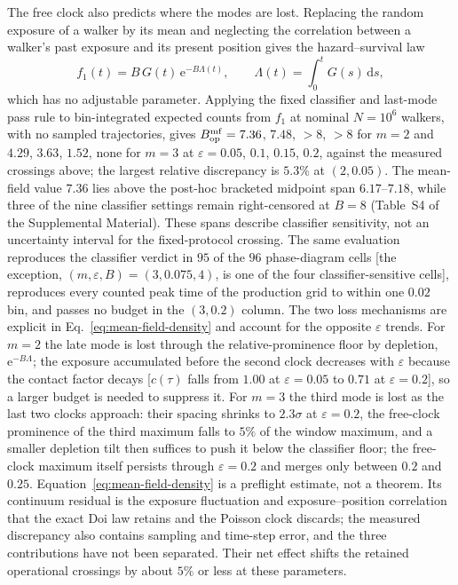 \documentclass[aps,physrev,reprint,amsmath,amssymb,longbibliography,floatfix]{revtex4-2}
\newcommand{\dd}{\mathrm d}
\newcommand{\e}{\mathrm e}
\begin{document}
The free clock also predicts where the modes are lost.  Replacing the random
exposure of a walker by its mean and neglecting the correlation between a
walker's past exposure and its present position gives the hazard--survival law
\begin{equation}
 f_1(t)=B\,G(t)\,\e^{-B\Lambda(t)},\qquad
 \Lambda(t)=\int_0^tG(s)\,\dd s,
 \label{eq:mean-field-density}
\end{equation}
which has no adjustable parameter.  Applying the fixed classifier and last-mode pass rule to bin-integrated
expected counts from \(f_1\) at nominal \(N=10^{6}\) walkers, with no
sampled trajectories, gives \(B_{\rm op}^{\rm mf}=7.36\), \(7.48\), \(>8\), \(>8\) for \(m=2\)
and \(4.29\), \(3.63\), \(1.52\), none for \(m=3\) at
\(\varepsilon=0.05\), \(0.1\), \(0.15\), \(0.2\), against the measured
crossings above; the largest relative discrepancy is \(5.3\%\) at \((2,0.05)\).  The
mean-field value \(7.36\) lies above the post-hoc bracketed midpoint span
\(6.17\)--\(7.18\), while three of the nine classifier settings remain
right-censored at \(B=8\) (Table~S4 of the Supplemental Material).  These
spans describe classifier sensitivity, not an uncertainty interval for the
fixed-protocol crossing.  The
same evaluation reproduces the classifier verdict in \(95\) of the \(96\)
phase-diagram cells [the exception, \((m,\varepsilon,B)=(3,0.075,4)\), is one
of the four classifier-sensitive cells], reproduces every counted peak time
of the production grid to within one \(0.02\) bin, and passes no budget in
the \((3,0.2)\) column.  The two loss mechanisms are explicit in
Eq.~\eqref{eq:mean-field-density} and account for the opposite
\(\varepsilon\) trends.  For \(m=2\) the late mode is lost through the
relative-prominence floor by depletion, \(\e^{-B\Lambda}\); the exposure
accumulated before the second clock decreases with \(\varepsilon\) because
the contact factor decays [\(c(\tau)\) falls from \(1.00\) at
\(\varepsilon=0.05\) to \(0.71\) at \(\varepsilon=0.2\)], so a larger budget
is needed to suppress it.  For \(m=3\) the third mode is lost as the last two clocks approach: their
spacing shrinks to \(2.3\sigma\) at \(\varepsilon=0.2\), the free-clock
prominence of the third maximum falls to \(5\%\) of the window maximum, and
a smaller depletion tilt then suffices to push it below the classifier
floor; the free-clock maximum itself persists through \(\varepsilon=0.2\)
and merges only between \(0.2\) and \(0.25\).  Equation~\eqref{eq:mean-field-density} is a
preflight estimate, not a theorem.  Its continuum residual is the exposure
fluctuation and exposure--position correlation that the exact Doi law
retains and the Poisson clock discards; the measured discrepancy also
contains sampling and time-step error, and the three contributions have not
been separated.  Their net effect shifts the retained operational crossings
by about \(5\%\) or less at these parameters.
\end{document}

